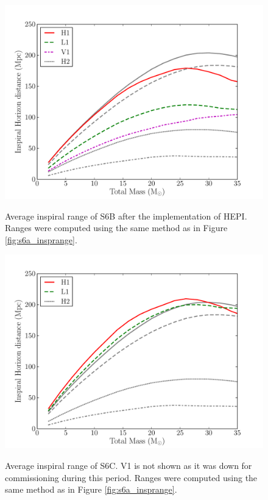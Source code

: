 \begin{figure}[p]
\begin{center}
\label{fig:s6b_post-hepi_insprange}
\includegraphics[width=6in]{figures/s6b_post-hepi_insprange.pdf}
\end{center}
\caption{Average inspiral range of S6B after the implementation of \ac{HEPI}. Ranges were computed using the same method as in Figure \ref{fig:s6a_insprange}.}
\end{figure}

\begin{figure}[p]
\begin{center}
\label{fig:s6c_insprange}
\includegraphics[width=6in]{figures/s6c_insprange.pdf}
\end{center}
\caption{Average inspiral range of S6C. V1 is not shown as it was down for commissioning during this period. Ranges were computed using the same method as in Figure \ref{fig:s6a_insprange}.}
\end{figure}

